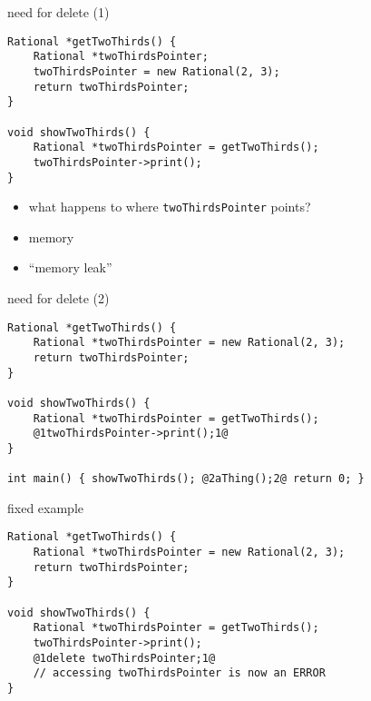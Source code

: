 \begin{frame}[fragile,label=cppNewDelete]{need for delete (1)}
\lstset{
    language=C++,
    style=smaller,
}
\begin{lstlisting}
Rational *getTwoThirds() {
    Rational *twoThirdsPointer;
    twoThirdsPointer = new Rational(2, 3);
    return twoThirdsPointer;
}

void showTwoThirds() {
    Rational *twoThirdsPointer = getTwoThirds();
    twoThirdsPointer->print();
}
\end{lstlisting}
\begin{itemize}
    \item what happens to where \texttt{twoThirdsPointer} points?
    \item<2> memory 
    \item<2> ``memory leak''
\end{itemize}
\end{frame}

\begin{frame}[fragile,label=cppNewDelete2]{need for delete (2)}
\begin{lstlisting}
Rational *getTwoThirds() {
    Rational *twoThirdsPointer = new Rational(2, 3);
    return twoThirdsPointer;
}

void showTwoThirds() {
    Rational *twoThirdsPointer = getTwoThirds();
    @1twoThirdsPointer->print();1@
}

int main() { showTwoThirds(); @2aThing();2@ return 0; }
\end{lstlisting}
\end{frame}

\begin{frame}[fragile,label=cppNewDelete3]{fixed example}
\begin{lstlisting}
Rational *getTwoThirds() {
    Rational *twoThirdsPointer = new Rational(2, 3);
    return twoThirdsPointer;
}

void showTwoThirds() {
    Rational *twoThirdsPointer = getTwoThirds();
    twoThirdsPointer->print();
    @1delete twoThirdsPointer;1@
    // accessing twoThirdsPointer is now an ERROR
}
\end{lstlisting}
\end{frame}

